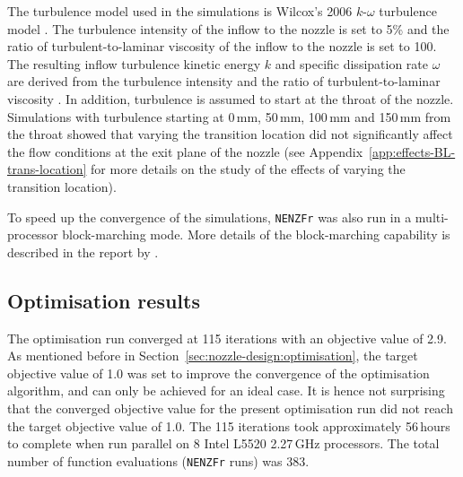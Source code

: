 \documentclass[12pt,a4paper]{article}
\begin{document}
The turbulence model used in the simulations is Wilcox's 2006 $k$-$\omega$ 
turbulence model . The turbulence intensity of the 
inflow to the nozzle is set to 5\% and the ratio of turbulent-to-laminar 
viscosity of the inflow to the nozzle is set to 100. The resulting inflow 
turbulence kinetic energy $k$ and specific dissipation rate $\omega$ are 
derived from the turbulence intensity and the ratio of turbulent-to-laminar 
viscosity . In addition, turbulence is assumed to start 
at the throat of the nozzle. Simulations with turbulence starting at 0\,mm, 
50\,mm, 100\,mm and 150\,mm from the throat showed that varying the transition 
location did not significantly affect the flow conditions at the exit plane of 
the nozzle (see Appendix~\ref{app:effects-BL-trans-location} for more details
on the study of the effects of varying the transition location).

To speed up the convergence of the simulations, \texttt{NENZFr} was also run 
in a multi-processor block-marching mode. More details of the block-marching 
capability is described in the report by .


\subsection{Optimisation results}
\label{sec:nozzle-design:optimisation-results}
%
The optimisation run converged at 115 iterations with an objective value of 
2.9. As mentioned before in Section~\ref{sec:nozzle-design:optimisation}, 
the target objective value of 1.0 was set to improve the convergence of the 
optimisation algorithm, and can only be achieved for an ideal case. It is
hence not surprising that the converged objective value for the present 
optimisation run did not reach the target objective value of 1.0. The 115 
iterations took approximately 56\,hours to complete when run parallel on 
8 Intel L5520 2.27\,GHz processors. The total number of function evaluations 
(\texttt{NENZFr} runs) was 383.
\end{document}
